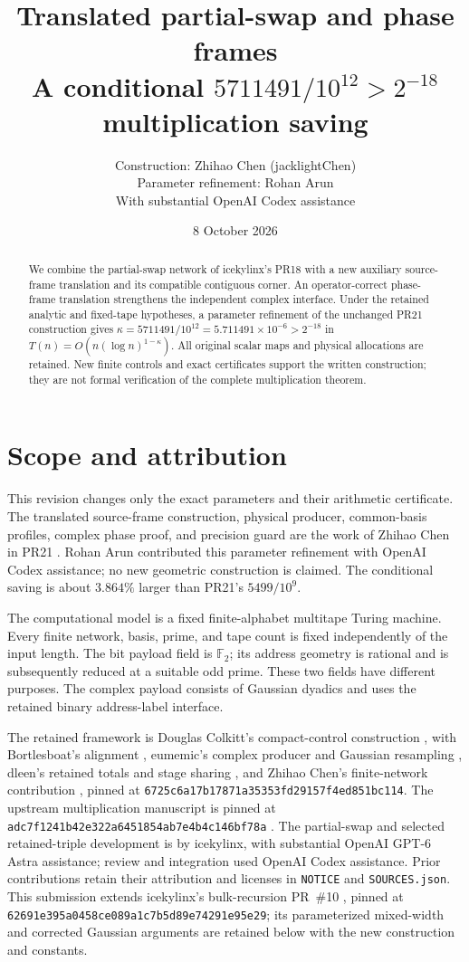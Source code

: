 \documentclass[11pt]{article}
\title{Translated partial-swap and phase frames\\
\large A conditional $5711491/10^{12}>2^{-18}$ multiplication saving}
\author{Construction: Zhihao Chen (jacklightChen)\\Parameter refinement: Rohan Arun\\\small With substantial OpenAI Codex assistance}
\date{8 October 2026}
\begin{document}
\maketitle
\begin{abstract}
We combine the partial-swap network of icekylinx's PR18 with a new
auxiliary source-frame translation and its compatible contiguous corner.
An operator-correct phase-frame translation strengthens the independent
complex interface. Under the retained analytic and fixed-tape hypotheses,
a parameter refinement of the unchanged PR21 construction gives $\kappa=5711491/10^{12}=5.711491\times10^{-6}>2^{-18}$ in
$T(n)=O(n(\log n)^{1-\kappa})$. All original scalar maps and physical
allocations are retained. New finite controls and exact certificates
support the written construction; they are not formal verification of
the complete multiplication theorem.
\end{abstract}

\section{Scope and attribution}
This revision changes only the exact parameters and their arithmetic
certificate. The translated source-frame construction, physical producer,
common-basis profiles, complex phase proof, and precision guard are the
work of Zhihao Chen in PR21 \cite{pr21}. Rohan Arun contributed this
parameter refinement with OpenAI Codex assistance; no new geometric
construction is claimed. The conditional saving is about $3.864\%$ larger
than PR21's $5499/10^9$.

The computational model is a fixed finite-alphabet multitape Turing machine.
Every finite network, basis, prime, and tape count is fixed independently of
the input length. The bit payload field is $\mathbb F_2$; its address
geometry is rational and is subsequently reduced at a suitable odd prime.
These two fields have different purposes. The complex payload consists of
Gaussian dyadics and uses the retained binary address-label interface.

The retained framework is Douglas Colkitt's compact-control construction
\cite{main}, with Bortlesboat's alignment \cite{pr2}, eumemic's complex
producer and Gaussian resampling \cite{pr3,pr5,pr6}, dleen's retained totals
and stage sharing \cite{pr4}, and Zhihao Chen's finite-network contribution
\cite{pr7}, pinned at
\texttt{6725c6a17b17871a35353fd29157f4ed851bc114}.
The upstream multiplication manuscript is pinned at
\texttt{adc7f1241b42e322a6451854ab7e4b4c146bf78a} \cite{upstream}.
The partial-swap and selected retained-triple development is by icekylinx,
with substantial OpenAI GPT-6 Astra assistance; review and integration used
OpenAI Codex assistance. Prior contributions retain their attribution and
licenses in \texttt{NOTICE} and \texttt{SOURCES.json}.
This submission extends icekylinx's bulk-recursion PR~\#10 \cite{pr10},
pinned at \texttt{62691e395a0458ce089a1c7b5d89e74291e95e29}; its
parameterized mixed-width and corrected Gaussian arguments are retained
below with the new construction and constants.
\end{document}
